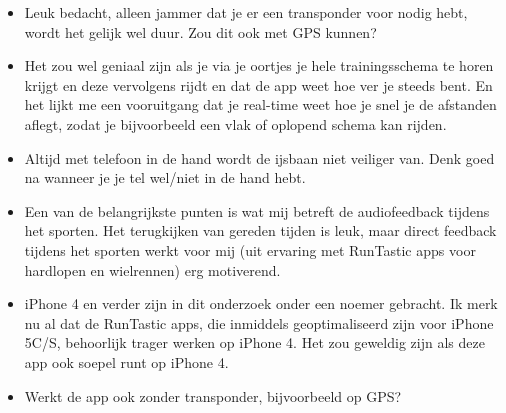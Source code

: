 \begin{itemize}
\item Leuk bedacht, alleen jammer dat je er een transponder voor nodig hebt, wordt het gelijk wel duur. Zou dit ook met GPS kunnen?
\item Het zou wel geniaal zijn als je via je oortjes je hele trainingsschema te horen krijgt en deze vervolgens rijdt en dat de app weet hoe ver je steeds bent. En het lijkt me een vooruitgang dat je real-time weet hoe je snel je de afstanden aflegt, zodat je bijvoorbeeld een vlak of oplopend schema kan rijden.
\item Altijd met telefoon in de hand wordt de ijsbaan niet veiliger van. Denk goed na wanneer je je tel wel/niet in de hand hebt.
\item Een van de belangrijkste punten is wat mij betreft de audiofeedback tijdens het sporten. Het terugkijken van gereden tijden is leuk, maar direct feedback tijdens het sporten werkt voor mij (uit ervaring met RunTastic apps voor hardlopen en wielrennen) erg motiverend.
\item iPhone 4 en verder zijn in dit onderzoek onder een noemer gebracht. Ik merk nu al dat de RunTastic apps, die inmiddels geoptimaliseerd zijn voor iPhone 5C/S, behoorlijk trager werken op iPhone 4. Het zou geweldig zijn als deze app ook soepel runt op iPhone 4. 
\item Werkt de app ook zonder transponder, bijvoorbeeld op GPS?
\end{itemize}